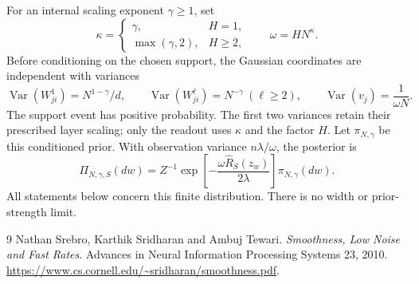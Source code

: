 \documentclass[11pt]{article}
\theoremstyle{definition}\newtheorem{definition}[theorem]{Definition}
\theoremstyle{remark}\newtheorem{remark}[theorem]{Remark}
\begin{document}
For an internal scaling exponent $\gamma\ge1$, set
\[
 \kappa=\begin{cases}\gamma,&H=1,\\\max(\gamma,2),&H\ge2,\end{cases}
 \qquad \omega=HN^\kappa.
\]
Before conditioning on the chosen support, the Gaussian coordinates are independent with variances
\begin{equation}
 \operatorname{Var}(W^1_{ji})=N^{1-\gamma}/d,\qquad
 \operatorname{Var}(W^\ell_{ji})=N^{-\gamma}\ (\ell\ge2),\qquad
 \operatorname{Var}(v_j)=\frac1{\omega N}.
 \label{eq:prior}
\end{equation}
The support event has positive probability. The first two variances retain their prescribed layer scaling; only the readout uses $\kappa$ and the factor $H$. Let $\pi_{N,\gamma}$ be this conditioned prior. With observation variance $n\lambda/\omega$, the posterior is
\begin{equation}
 \Pi_{N,\gamma,S}(dw)=Z^{-1}\exp\!\left[-\frac{\omega\widehat R_S(z_w)}{2\lambda}\right]\pi_{N,\gamma}(dw).
 \label{eq:posterior}
\end{equation}
All statements below concern this finite distribution. There is no width or prior-strength limit.





\begin{thebibliography}{9}
 Nathan Srebro, Karthik Sridharan and Ambuj Tewari. \emph{Smoothness, Low Noise and Fast Rates}. Advances in Neural Information Processing Systems 23, 2010. \url{https://www.cs.cornell.edu/~sridharan/smoothness.pdf}.
\end{thebibliography}
\end{document}
